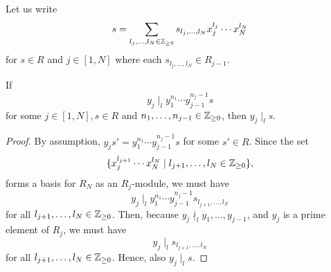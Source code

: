Let us write
\begin{equation*}
	s = \sum_{l_j, \dots, l_N \in \mathbb{Z}_{\geq 0}} s_{l_j,\ldots,l_N}x_j^{l_j} \cdots x_N^{l_N}
\end{equation*}
for $s \in R$ and $j \in [1, N]$ where each $s_{l_j, \dots, l_N} \in R_{j-1}$.

\begin{lemma}\label{lem:y_divides_ys}
	If
	\begin{equation*}
		y_j \mid_l y_1^{n_1}\cdots y_{j-1}^{n_j-1}s
	\end{equation*}
	for some $j \in [1, N], s\in R$ and $n_1,\dots,n_{j-1}\in \mathbb{Z}_{\geq 0}$, then $y_j \mid_l s$.
\end{lemma}
\begin{proof}
	By assumption, $y_j s' = y_1^{n_1}\cdots y_{j-1}^{n_j - 1}s$ for some $s' \in R$. Since
	the set
	\begin{equation*}
		\{x_j^{l_{j+1}}\cdots x_N^{l_N} \mid l_{j+1}, \dots, l_N \in \mathbb{Z}_{\geq 0}\},
	\end{equation*}
	forms a basis for $R_{N}$ as an $R_j$-module, we must have
	\begin{equation*}
		y_j \mid_l y_1^{n_1}\cdots y_{j-1}^{n_j -1} s_{l_{j+1}, \dots, l_N}
	\end{equation*}
	for all $l_{j+1}, \dots, l_N \in \mathbb{Z}_{\geq 0}$. Then, because $y_j \nmid_l y_1, \dots,
		y_{j-1}$, and $y_j$ is a prime element of $R_j$, we must have
	\begin{equation*}
		y_j \mid_l s_{l_{j+1}, \ldots, l_N}
	\end{equation*}
	for all $l_{j+1}, \dots, l_N \in \mathbb{Z}_{\geq 0}$. Hence, also $y_j \mid_l s$.
\end{proof}

